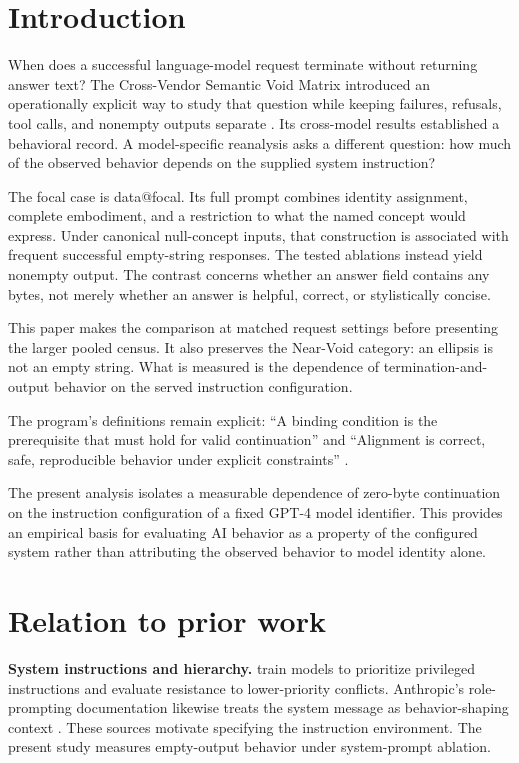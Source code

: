 \documentclass[11pt]{article}
\makeatletter
\newcommand{\D}[1]{\csname data@#1\endcsname}
\makeatother
\begin{document}
\section{Introduction}
When does a successful language-model request terminate without returning answer text? The Cross-Vendor Semantic Void Matrix introduced an operationally explicit way to study that question while keeping failures, refusals, tool calls, and nonempty outputs separate \citep{pal_matrix}. Its cross-model results established a behavioral record. A model-specific reanalysis asks a different question: how much of the observed behavior depends on the supplied system instruction?

The focal case is \D{focal}. Its full prompt combines identity assignment, complete embodiment, and a restriction to what the named concept would express. Under canonical null-concept inputs, that construction is associated with frequent successful empty-string responses. The tested ablations instead yield nonempty output. The contrast concerns whether an answer field contains any bytes, not merely whether an answer is helpful, correct, or stylistically concise.

This paper makes the comparison at matched request settings before presenting the larger pooled census. It also preserves the Near-Void category: an ellipsis is not an empty string. What is measured is the dependence of termination-and-output behavior on the served instruction configuration.

The program's definitions remain explicit: ``A binding condition is the prerequisite that must hold for valid continuation'' and ``Alignment is correct, safe, reproducible behavior under explicit constraints'' \citep{pal_synthesis,pal_alignment}.

The present analysis isolates a measurable dependence of zero-byte continuation on the instruction configuration of a fixed GPT-4 model identifier. This provides an empirical basis for evaluating AI behavior as a property of the configured system rather than attributing the observed behavior to model identity alone.

\section{Relation to prior work}
\textbf{System instructions and hierarchy.} \citet{wallace} train models to prioritize privileged instructions and evaluate resistance to lower-priority conflicts. Anthropic's role-prompting documentation likewise treats the system message as behavior-shaping context \citep{anthropic_prompt}. These sources motivate specifying the instruction environment. The present study measures empty-output behavior under system-prompt ablation.
\end{document}
